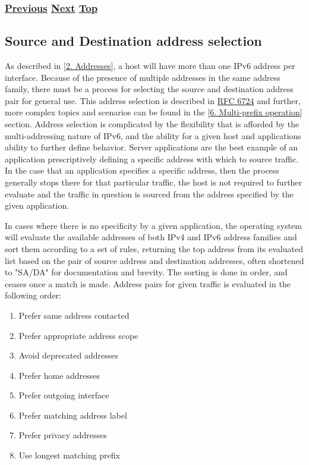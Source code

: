 \documentclass[
]{article}
\providecommand{\tightlist}{%
  \setlength{\itemsep}{0pt}\setlength{\parskip}{0pt}}
\begin{document}
\subsubsection{\texorpdfstring{\hyperref[extension-headers-and-options]{Previous}
\hyperref[source-and-destination-address-selection]{Next}
\hyperref[ipv6-basic-technology]{Top}}{Previous Next Top}}\label{previous-next-top-17}

\pagebreak

\subsection{Source and Destination address
selection}\label{source-and-destination-address-selection}

As described in {[}\hyperref[addresses]{2. Addresses}{]}, a host will
have more than one IPv6 address per interface. Because of the presence
of multiple addresses in the same address family, there must be a
process for selecting the source and destination address pair for
general use. This address selection is described in
\href{https://www.rfc-editor.org/info/rfc6724}{RFC 6724} and further,
more complex topics and scenarios can be found in the
{[}\hyperref[multi-prefix-operation]{6. Multi-prefix operation}{]}
section. Address selection is complicated by the flexibility that is
afforded by the multi-addressing nature of IPv6, and the ability for a
given host and applications ability to further define behavior. Server
applications are the best example of an application prescriptively
defining a specific address with which to source traffic. In the case
that an application specifies a specific address, then the process
generally stops there for that particular traffic, the host is not
required to further evaluate and the traffic in question is sourced from
the address specified by the given application.

In cases where there is no specificity by a given application, the
operating system will evaluate the available addresses of both IPv4 and
IPv6 address families and sort them according to a set of rules,
returning the top address from its evaluated list based on the pair of
source address and destination addresses, often shortened to "SA/DA" for
documentation and brevity. The sorting is done in order, and ceases once
a match is made. Address pairs for given traffic is evaluated in the
following order:

\begin{enumerate}
\def\labelenumi{\arabic{enumi}.}
\tightlist
\item
  Prefer same address contacted
\item
  Prefer appropriate address scope
\item
  Avoid deprecated addresses
\item
  Prefer home addresses
\item
  Prefer outgoing interface
\item
  Prefer matching address label
\item
  Prefer privacy addresses
\item
  Use longest matching prefix
\end{enumerate}
\end{document}

